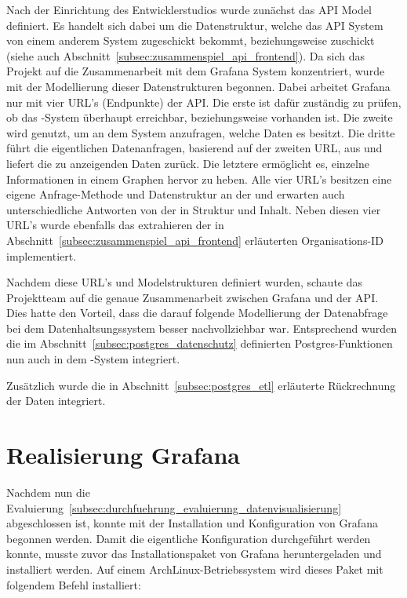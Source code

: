 Nach der Einrichtung des Entwicklerstudios wurde zunächst das API Model
definiert. Es handelt sich dabei um die Datenstruktur, welche das API System
von einem anderem System zugeschickt bekommt, beziehungsweise zuschickt
(siehe auch Abschnitt~\ref{subsec:zusammenspiel_api_frontend}). Da
sich das Projekt auf die Zusammenarbeit mit dem Grafana System konzentriert,
wurde mit der Modellierung dieser Datenstrukturen begonnen. Dabei arbeitet
Grafana nur mit vier URL's (Endpunkte) der API\@. Die erste ist dafür zuständig
zu prüfen, ob das \hyp{}System überhaupt erreichbar, beziehungsweise
vorhanden ist. Die zweite wird genutzt, um an dem  System anzufragen,
welche Daten es besitzt. Die dritte führt die eigentlichen Datenanfragen,
basierend auf der zweiten URL, aus und liefert die zu anzeigenden Daten zurück.
Die letztere ermöglicht es, einzelne Informationen in einem Graphen hervor zu
heben. Alle vier URL's besitzen eine eigene Anfrage\hyp{}Methode und
Datenstruktur an der  und erwarten auch unterschiedliche Antworten von
der  in Struktur und Inhalt. Neben diesen vier URL's wurde ebenfalls
das extrahieren der in Abschnitt~\ref{subsec:zusammenspiel_api_frontend}
erläuterten Organisations\hyp{}ID implementiert.

Nachdem diese URL's und Modelstrukturen definiert wurden, schaute das
Projektteam auf die genaue Zusammenarbeit zwischen Grafana und der API\@. Dies
hatte den Vorteil, dass die darauf folgende Modellierung der Datenabfrage bei
dem Datenhaltsungssystem besser nachvollziehbar war. Entsprechend wurden die im
Abschnitt~\ref{subsec:postgres_datenschutz} definierten Postgres-Funktionen nun
auch in dem \hyp{}System integriert.

Zusätzlich wurde die in Abschnitt~\ref{subsec:postgres_etl} erläuterte
Rückrechnung der Daten integriert.
\nl%

\section{Realisierung Grafana}
\label{sec:realisierung_grafana}
Nachdem nun die
Evaluierung~\ref{subsec:durchfuehrung_evaluierung_datenvisualisierung}
abgeschlossen ist, konnte mit der Installation und Konfiguration von Grafana
begonnen werden. Damit die eigentliche Konfiguration durchgeführt werden
konnte, musste zuvor das Installationspaket von Grafana heruntergeladen und
installiert werden. Auf einem ArchLinux\hyp{}Betriebssystem wird dieses Paket
mit folgendem Befehl installiert:


